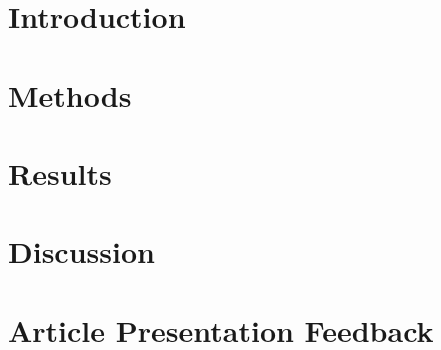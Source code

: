 \documentclass[a4paper]{article}
\begin{document}


\section{Introduction}


\section{Methods}


\section{Results}


\section{Discussion}


\section{Article Presentation Feedback}


\printbibliography
\end{document}
